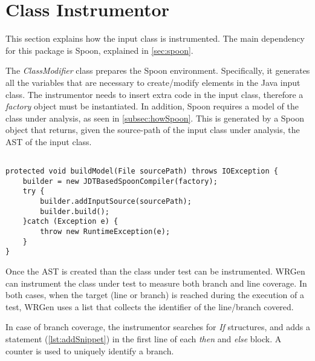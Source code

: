 \section{Class Instrumentor}\label{sec:ClassInstr}
This section explains how the input class is instrumented. The main dependency for this package is Spoon, explained in \autoref{sec:spoon}.

The \emph{ClassModifier} class prepares the Spoon environment.
Specifically, it generates all the variables that are necessary to create/modify elements in the Java input class. The instrumentor needs to insert extra code in the input class, therefore a \emph{factory} object must be instantiated. In addition, Spoon requires a model of the class under analysis, as seen in \autoref{subsec:howSpoon}. This is generated by a Spoon object that returns, given the source-path of the input class under analysis, the AST of the input class.

\begin{lstlisting}[caption={The function to create the AST from the ClassModifier class},label={lst:ASTmodel}]% Start your code-block

protected void buildModel(File sourcePath) throws IOException {
	builder = new JDTBasedSpoonCompiler(factory);		
	try {
		builder.addInputSource(sourcePath);
		builder.build();
	}catch (Exception e) {
		throw new RuntimeException(e);
	}		
}
\end{lstlisting}

Once the AST is created than the class under test can be instrumented. WRGen can instrument the class under test to measure both branch and line coverage. In both cases, when the target (line or branch) is reached during the execution of a test, WRGen uses a list that collects the identifier of the line/branch covered.


In case of branch coverage, the instrumentor searches for \emph{If} structures, and adds a statement (\autoref{lst:addSnippet}) in the first line of each \emph{then} and \emph{else} block. A counter is used to uniquely identify a branch.

